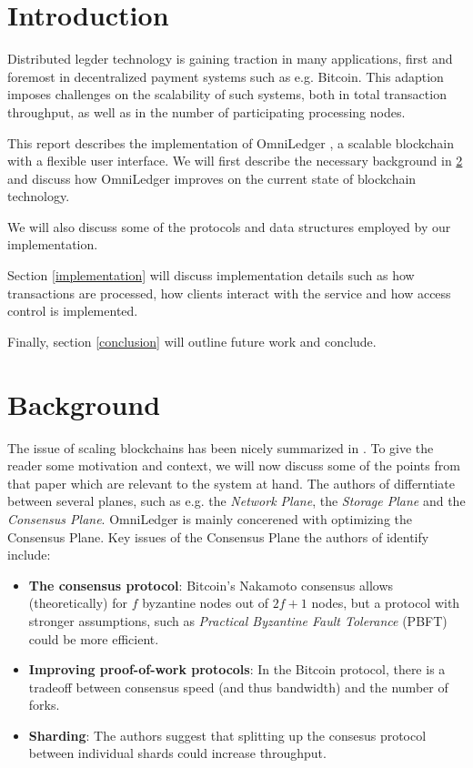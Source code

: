 \documentclass[11pt, a4paper, twoside, openright]{article} %
\begin{document}

\newpage

\tableofcontents

\section{Introduction}
Distributed legder technology is gaining traction in many applications,
first and foremost in decentralized payment systems such as e.g. Bitcoin.
This adaption imposes challenges on the scalability of such systems, both in
total transaction throughput, as well as in the number of participating
processing nodes.

This report describes the implementation of OmniLedger
\cite{KokorisKogias2017OmniLedgerAS}, a scalable blockchain
with a flexible user interface. We will first describe the necessary background
in \ref{background} and discuss how OmniLedger improves on the current state of
blockchain technology.

We will also discuss some of the protocols and data structures employed by our
implementation.

Section \ref{implementation} will discuss implementation details such as how
transactions are processed, how clients interact with the service and how
access control is implemented.

Finally, section \ref{conclusion} will outline future work and conclude.

\section{Background} \label{background}
The issue of scaling blockchains has been nicely summarized in
\cite{croman2016scaling}. To give the reader some motivation and context,
we will now discuss some of the points from that paper
which are relevant to the system at hand.
The authors of \cite{croman2016scaling} differntiate between several planes,
such as e.g. the
\textit{Network Plane}, the \textit{Storage Plane} and the
\textit{Consensus Plane}. OmniLedger is mainly concerened with optimizing the
Consensus Plane.
Key issues of the Consensus Plane the authors of \cite{croman2016scaling} 
identify include:
\begin{itemize}
    \item \textbf{The consensus protocol}:
        Bitcoin's Nakamoto consensus \cite{nakamoto2008bitcoin} allows
        (theoretically) for $f$ byzantine nodes out of $2f + 1$ nodes, but a
        protocol with stronger assumptions, such as
        \textit{Practical Byzantine Fault Tolerance} (PBFT)
        \cite{castro1999practical} could be more efficient.
    \item \textbf{Improving proof-of-work protocols}:
        In the Bitcoin protocol, there is a tradeoff between consensus speed
        (and thus bandwidth) and the number of forks.
    \item \textbf{Sharding}:
        The authors suggest that splitting up the consesus protocol between
        individual shards could increase throughput.
\end{itemize}
\end{document}
